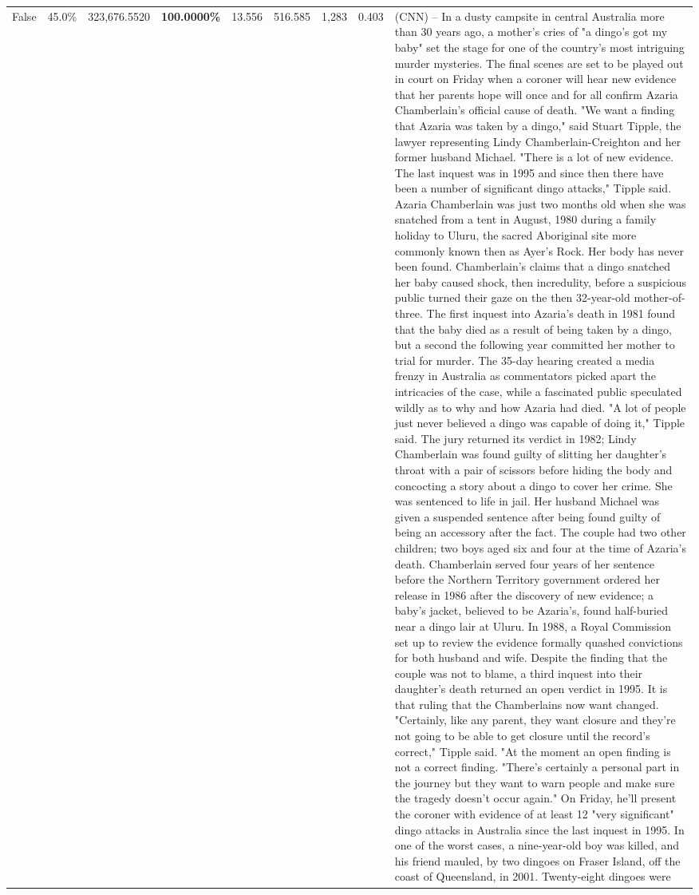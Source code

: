 \begin{table}[H]
\begin{tabular}{lllrlllll}
False & 45.0\% & 323,676.5520 & \bfseries \color{red} 100.0000\% & 13.556 & 516.585 & 1,283 & 0.403 & (CNN) -- In a dusty campsite in central Australia more than 30 years ago, a mother's cries of "a dingo's got my baby" set the stage for one of the country's most intriguing murder mysteries. The final scenes are set to be played out in court on Friday when a coroner will hear new evidence that her parents hope will once and for all confirm Azaria Chamberlain's official cause of death. "We want a finding that Azaria was taken by a dingo," said Stuart Tipple, the lawyer representing Lindy Chamberlain-Creighton and her former husband Michael. "There is a lot of new evidence. The last inquest was in 1995 and since then there have been a number of significant dingo attacks," Tipple said. Azaria Chamberlain was just two months old when she was snatched from a tent in August, 1980 during a family holiday to Uluru, the sacred Aboriginal site more commonly known then as Ayer's Rock. Her body has never been found. Chamberlain's claims that a dingo snatched her baby caused shock, then incredulity, before a suspicious public turned their gaze on the then 32-year-old mother-of-three. The first inquest into Azaria's death in 1981 found that the baby died as a result of being taken by a dingo, but a second the following year committed her mother to trial for murder. The 35-day hearing created a media frenzy in Australia as commentators picked apart the intricacies of the case, while a fascinated public speculated wildly as to why and how Azaria had died. "A lot of people just never believed a dingo was capable of doing it," Tipple said. The jury returned its verdict in 1982; Lindy Chamberlain was found guilty of slitting her daughter's throat with a pair of scissors before hiding the body and concocting a story about a dingo to cover her crime. She was sentenced to life in jail. Her husband Michael was given a suspended sentence after being found guilty of being an accessory after the fact. The couple had two other children; two boys aged six and four at the time of Azaria's death. Chamberlain served four years of her sentence before the Northern Territory government ordered her release in 1986 after the discovery of new evidence; a baby's jacket, believed to be Azaria's, found half-buried near a dingo lair at Uluru. In 1988, a Royal Commission set up to review the evidence formally quashed convictions for both husband and wife. Despite the finding that the couple was not to blame, a third inquest into their daughter's death returned an open verdict in 1995. It is that ruling that the Chamberlains now want changed. "Certainly, like any parent, they want closure and they're not going to be able to get closure until the record's correct," Tipple said. "At the moment an open finding is not a correct finding. "There's certainly a personal part in the journey but they want to warn people and make sure the tragedy doesn't occur again." On Friday, he'll present the coroner with evidence of at least 12 "very significant" dingo attacks in Australia since the last inquest in 1995. In one of the worst cases, a nine-year-old boy was killed, and his friend mauled, by two dingoes on Fraser Island, off the coast of Queensland, in 2001. Twenty-eight dingoes were 
\end{tabular}
\end{table}
